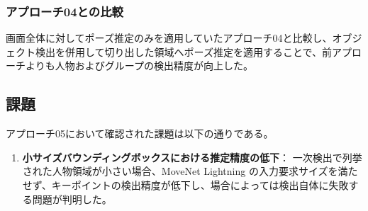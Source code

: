 \subsubsection{アプローチ04との比較}
画面全体に対してポーズ推定のみを適用していたアプローチ04と比較し、オブジェクト検出を併用して切り出した領域へポーズ推定を適用することで、前アプローチよりも人物およびグループの検出精度が向上した。

\subsection{課題}
アプローチ05において確認された課題は以下の通りである。

\begin{enumerate}
    \item \textbf{小サイズバウンディングボックスにおける推定精度の低下}：
    一次検出で列挙された人物領域が小さい場合、MoveNet Lightning の入力要求サイズを満たせず、キーポイントの検出精度が低下し、場合によっては検出自体に失敗する問題が判明した。
\end{enumerate}

\clearpage
